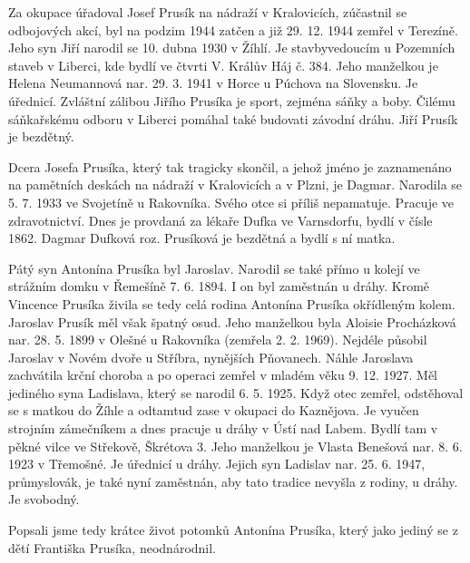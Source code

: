 \documentclass[../dejiny-rodu-prusiku.tex]{subfiles}
\begin{document}
Za okupace úřadoval Josef Prusík na nádraží v Kralovicích, zúčastnil se odbojových akcí, byl na podzim 1944 zatčen a již 29. 12. 1944 zemřel v Terezíně. Jeho syn Jiří narodil se 10. dubna 1930 v Žíhlí. Je stavbyvedoucím u Pozemních staveb v Liberci, kde bydlí ve čtvrti V. Králův Háj č. 384. Jeho manželkou je Helena Neumannová nar. 29. 3. 1941 v Horce u Púchova na Sloven­sku. Je úřednicí. Zvláštní zálibou Jiřího Prusíka je sport, zejména sáňky a boby. Čilému sáňkařskému odboru v Liberci pomáhal také budovati závodní dráhu. Jiří Prusík je bezdětný.

Dcera Josefa Prusíka, který tak tragicky skončil, a jehož jméno je zaznamenáno na pamětních deskách na nádraží v Kralovicích a v Plzni, je Dagmar. Narodila se 5. 7. 1933 ve Svojetíně u Rakovníka. Svého otce si příliš nepamatuje. Pracuje ve zdravotnictví. Dnes je provdaná za lékaře Dufka ve Varnsdorfu, bydlí v čísle 1862. Dagmar Dufková roz. Prusíková je bezdětná a bydlí s ní matka.

Pátý syn Antonína Prusíka byl Jaroslav. Narodil se také přímo u kolejí ve strážním domku v Řemešíně 7. 6. 1894. I on byl zaměstnán u dráhy. Kromě Vincence Prusíka živila se tedy celá rodina Antonína Prusíka okřídleným kolem. Jaroslav Prusík měl však špatný osud. Jeho manželkou byla Aloisie Procházková nar. 28. 5. 1899 v Olešné u Rakovníka (zemřela 2. 2. 1969). Nejdéle působil Jaroslav v Novém dvoře u Stříbra, nynějších Pňovanech. Náhle Jaroslava zachvátila krční choroba a po operaci zemřel v mladém věku 9. 12. 1927. Měl jediného syna Ladislava, který se narodil 6. 5. 1925. Když otec zemřel, odstěhoval se s matkou do Žíhle a odtamtud zase v okupaci do Kaznějova. Je vyučen strojním zámečníkem a dnes pracuje u dráhy v Ústí nad Labem. Bydlí tam v pěkné vilce ve Střekově, Škrétova 3. Jeho manželkou je Vlasta Benešová nar. 8. 6. 1923 v Třemošné. Je úřednicí u dráhy. Jejich syn Ladislav nar. 25. 6. 1947, průmyslovák, je také nyní zaměstnán, aby tato tradice nevyšla z rodiny, u dráhy. Je svobodný.

Popsali jsme tedy krátce život potomků Antonína Prusíka, který jako jediný se z dětí Františka Prusíka, neodnárodnil.
\end{document}
